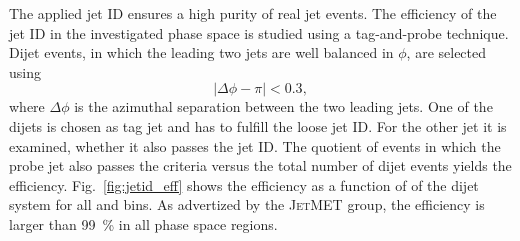 The applied jet ID ensures a high purity of real jet events. The efficiency of
the jet ID in the investigated phase space is studied using a
tag-and-probe technique. Dijet events, in which the leading two jets are well
balanced in $\phi$, are selected using
%
\begin{equation*}
    | \Delta\phi - \pi | < 0.3,
\end{equation*}
%
where $\Delta\phi$ is the azimuthal separation between the two leading jets. One
of the dijets is chosen as tag jet and has to fulfill the loose jet ID. For the
other jet it is examined, whether it also passes the jet ID. The quotient of events in
which the probe jet also passes the criteria versus the total number of dijet
events yields the efficiency. Fig.~\ref{fig:jetid_eff} shows the
efficiency as a function of \ptavg of the dijet system for all \ystar and
\yboost bins. As advertized by the \textsc{JetMET} group, the efficiency is
larger than \SI{99}{\percent} in all phase space regions.


